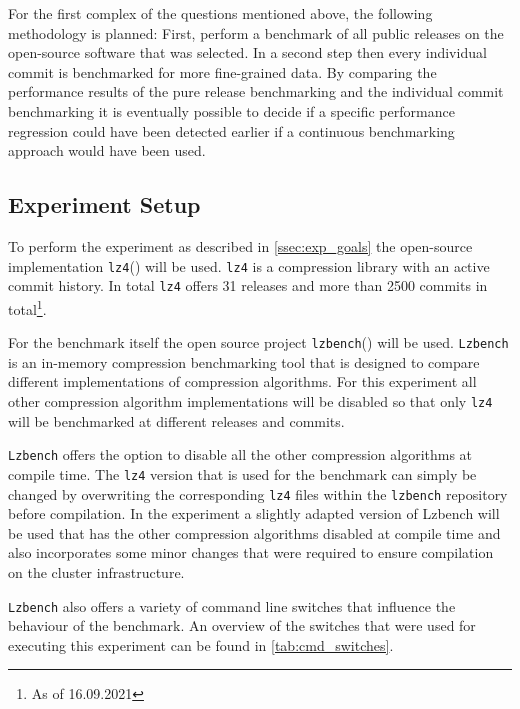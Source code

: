 \documentclass[	runningheads,
				a4paper]{llncs}
\begin{document}
	For the first complex of the questions mentioned above, the following methodology is planned: First, perform a benchmark of all public releases on the open-source software that was selected. In a second step then every individual commit is benchmarked for more fine-grained data. By comparing the performance results of the pure release benchmarking and the individual commit benchmarking it is eventually possible to decide if a specific performance regression could have been detected earlier if a continuous benchmarking approach would have been used.

	\subsection{Experiment Setup}
	\label{ssec:exp_setup}
	
	To perform the experiment as described in \autoref{ssec:exp_goals} the open-source implementation \texttt{lz4}(\cite{gitlz4}) will be used. \texttt{lz4} is a compression library with an active commit history. In total \texttt{lz4} offers 31 releases and more than 2500 commits in total\footnote{As of 16.09.2021}. 
	
	For the benchmark itself the open source project \texttt{lzbench}(\cite{gitlzbench}) will be used. \texttt{Lzbench} is an in-memory compression benchmarking tool that is designed to compare different implementations of compression algorithms. For this experiment all other compression algorithm implementations will be disabled so that only \texttt{lz4} will be benchmarked at different releases and commits. 
	
	\texttt{Lzbench} offers the option to disable all the other compression algorithms at compile time. The \texttt{lz4} version that is used for the benchmark can simply be changed by overwriting the corresponding \texttt{lz4} files within the \texttt{lzbench} repository before compilation. In the experiment a slightly adapted version of Lzbench will be used that has the other compression algorithms disabled at compile time and also incorporates some minor changes that were required to ensure compilation on the cluster infrastructure.

	\texttt{Lzbench} also offers a variety of command line switches that influence the behaviour of the benchmark. An overview of the switches that were used for executing this experiment can be found in \autoref{tab:cmd_switches}.
\end{document}

